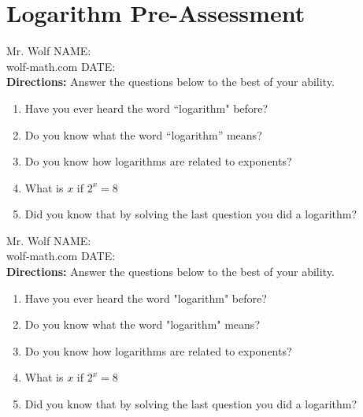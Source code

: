 \documentclass[12pt]{article}
\begin{document}
\pagebreak

\section{Logarithm Pre-Assessment}

Mr. Wolf \hfill NAME:\underline{\hspace{3in}}\\ 
wolf-math.com \hfill DATE:\underline{\hspace{2in}}\\


\textbf{Directions:} Answer the questions below to the best of your ability.

\begin{enumerate}
	\item Have you ever heard the word ``logarithm" before?\\
	
	\item Do you know what the word ``logarithm'' means?\\
	
	\item Do you know how logarithms are related to exponents?\\
	

	\item What is $x$ if $2^{x}=8$\\

	
	\item Did you know that by solving the last question you did a logarithm?\\

\end{enumerate}

\vspace{1cm}

Mr. Wolf \hfill NAME:\underline{\hspace{3in}}\\ 
wolf-math.com \hfill DATE:\underline{\hspace{2in}}\\

\textbf{Directions:} Answer the questions below to the best of your ability.

\begin{enumerate}
	\item Have you ever heard the word "logarithm" before?\\
	
	\item Do you know what the word "logarithm" means?\\
	
	\item Do you know how logarithms are related to exponents?\\
	
	\item What is $x$ if $2^{x}=8$\\

	\item Did you know that by solving the last question you did a logarithm?\\

\end{enumerate}
\end{document}
